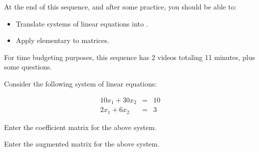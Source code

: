 







At the end of this sequence, and after some practice, you should be able to:

\begin{itemize}
\item Translate systems of linear equations into {}.
\item Apply elementary {} to matrices.  
\end{itemize}



For time budgeting purposes, this sequence has 2 videos totaling 11 minutes, 
plus some questions.  






\endedxtext


\endedxvertical








Consider the following system of linear equations:

\begin{eqnarray*}
10x_1 + 30x_2 & = & 10 \\
2x_1 + 6x_2 & = & 3 
\end{eqnarray*}



Enter the coefficient matrix for the above system.  







Enter the augmented matrix for the above system. 






